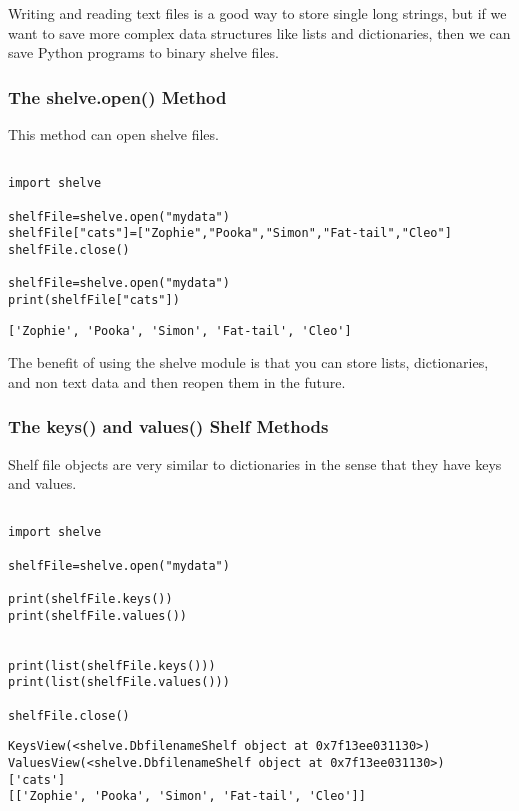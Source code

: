 \documentclass[11pt]{article}
\begin{document}
Writing and reading text files is a good way to store single long strings, but if we want to save more complex data structures like lists and dictionaries, then we can save Python programs to binary shelve files.

\subsubsection{The shelve.open() Method}
\label{sec:orgdae3e4b}

This method can open shelve files.

\begin{verbatim}

import shelve

shelfFile=shelve.open("mydata")
shelfFile["cats"]=["Zophie","Pooka","Simon","Fat-tail","Cleo"]
shelfFile.close()

shelfFile=shelve.open("mydata")
print(shelfFile["cats"])

\end{verbatim}

\begin{verbatim}
['Zophie', 'Pooka', 'Simon', 'Fat-tail', 'Cleo']
\end{verbatim}


The benefit of using the shelve module is that you can store lists, dictionaries, and non text data and then reopen them in the future.

\subsubsection{The keys() and values() Shelf Methods}
\label{sec:orgc8b9057}

Shelf file objects are very similar to dictionaries in the sense that they have keys and values.

\begin{verbatim}

import shelve

shelfFile=shelve.open("mydata")

print(shelfFile.keys())
print(shelfFile.values())


print(list(shelfFile.keys()))
print(list(shelfFile.values()))

shelfFile.close()
\end{verbatim}

\begin{verbatim}
KeysView(<shelve.DbfilenameShelf object at 0x7f13ee031130>)
ValuesView(<shelve.DbfilenameShelf object at 0x7f13ee031130>)
['cats']
[['Zophie', 'Pooka', 'Simon', 'Fat-tail', 'Cleo']]
\end{verbatim}
\end{document}
